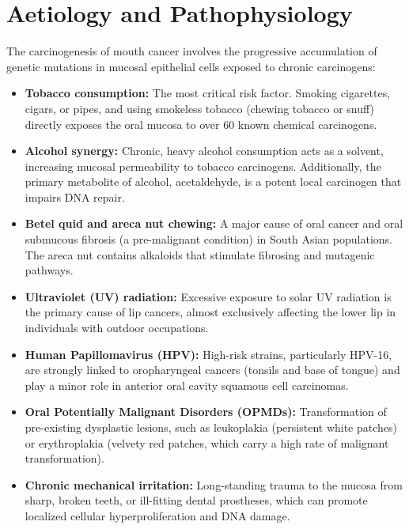 \section*{Aetiology and Pathophysiology}
The carcinogenesis of mouth cancer involves the progressive accumulation of genetic mutations in mucosal epithelial cells exposed to chronic carcinogens:
\begin{itemize}
    \item \textbf{Tobacco consumption:} The most critical risk factor. Smoking cigarettes, cigars, or pipes, and using smokeless tobacco (chewing tobacco or snuff) directly exposes the oral mucosa to over 60 known chemical carcinogens.
    \item \textbf{Alcohol synergy:} Chronic, heavy alcohol consumption acts as a solvent, increasing mucosal permeability to tobacco carcinogens. Additionally, the primary metabolite of alcohol, acetaldehyde, is a potent local carcinogen that impairs DNA repair.
    \item \textbf{Betel quid and areca nut chewing:} A major cause of oral cancer and oral submucous fibrosis (a pre-malignant condition) in South Asian populations. The areca nut contains alkaloids that stimulate fibrosing and mutagenic pathways.
    \item \textbf{Ultraviolet (UV) radiation:} Excessive exposure to solar UV radiation is the primary cause of lip cancers, almost exclusively affecting the lower lip in individuals with outdoor occupations.
    \item \textbf{Human Papillomavirus (HPV):} High-risk strains, particularly HPV-16, are strongly linked to oropharyngeal cancers (tonsils and base of tongue) and play a minor role in anterior oral cavity squamous cell carcinomas.
    \item \textbf{Oral Potentially Malignant Disorders (OPMDs):} Transformation of pre-existing dysplastic lesions, such as leukoplakia (persistent white patches) or erythroplakia (velvety red patches, which carry a high rate of malignant transformation).
    \item \textbf{Chronic mechanical irritation:} Long-standing trauma to the mucosa from sharp, broken teeth, or ill-fitting dental prostheses, which can promote localized cellular hyperproliferation and DNA damage.
\end{itemize}

